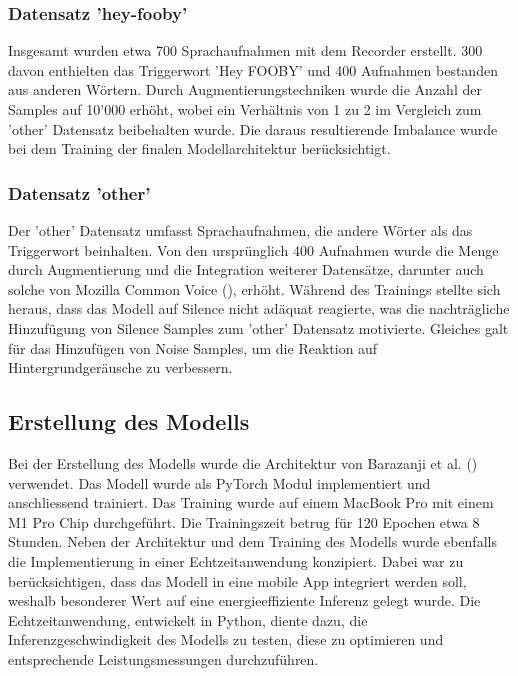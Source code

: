 \documentclass[11pt,a4paper]{article}
\begin{document}
\subsubsection{Datensatz 'hey-fooby'}
Insgesamt wurden etwa 700 Sprachaufnahmen mit dem Recorder erstellt. 300 davon enthielten das 
Triggerwort 'Hey FOOBY' und 400 Aufnahmen bestanden aus anderen Wörtern. Durch 
Augmentierungstechniken wurde die Anzahl der Samples auf 10'000 erhöht, wobei ein Verhältnis von 
1 zu 2 im Vergleich zum 'other' Datensatz beibehalten wurde. Die daraus resultierende 
Imbalance wurde bei dem Training der finalen Modellarchitektur berücksichtigt.

\subsubsection{Datensatz 'other'}
Der 'other' Datensatz umfasst Sprachaufnahmen, die andere Wörter als das Triggerwort beinhalten. 
Von den ursprünglich 400 Aufnahmen wurde die Menge durch Augmentierung und die Integration 
weiterer Datensätze, darunter auch solche von Mozilla Common Voice (\cite{ardila2020common}), 
erhöht. Während des Trainings stellte sich heraus, dass das Modell auf Silence nicht adäquat 
reagierte, was die nachträgliche Hinzufügung von Silence Samples zum 'other' Datensatz motivierte. 
Gleiches galt für das Hinzufügen von Noise Samples, um die Reaktion auf Hintergrundgeräusche zu 
verbessern.


\newpage

\subsection{Erstellung des Modells}
Bei der Erstellung des Modells wurde die Architektur von Barazanji et al. 
(\cite{barazanji2023heyditto}) verwendet. Das Modell wurde als PyTorch 
Modul implementiert und anschliessend trainiert. Das Training wurde auf einem MacBook Pro mit einem M1 Pro Chip 
durchgeführt. Die Trainingszeit betrug für 120 Epochen etwa 8 Stunden. Neben der Architektur und 
dem Training des Modells wurde ebenfalls die Implementierung in einer Echtzeitanwendung konzipiert. 
Dabei war zu berücksichtigen, dass das Modell in eine mobile App integriert werden soll, weshalb 
besonderer Wert auf eine energieeffiziente Inferenz gelegt wurde. Die Echtzeitanwendung, entwickelt 
in Python, diente dazu, die Inferenzgeschwindigkeit des Modells zu testen, diese zu optimieren und 
entsprechende Leistungsmessungen durchzuführen.
\end{document}
